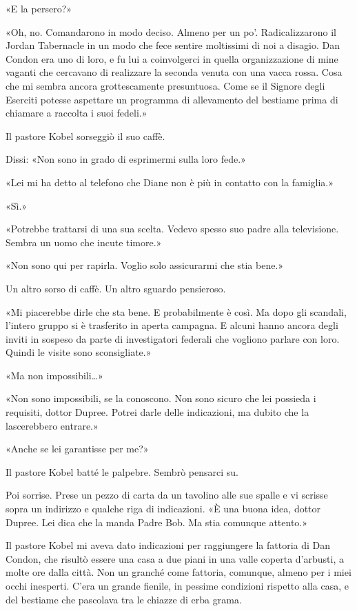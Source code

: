 «E la persero?»

«Oh, no. Comandarono in modo deciso. Almeno per un po'. Radicalizzarono
il Jordan Tabernacle in un modo che fece sentire moltissimi di noi a
disagio. Dan Condon era uno di loro, e fu lui a coinvolgerci in quella
organizzazione di mine vaganti che cercavano di realizzare la seconda
venuta con una vacca rossa. Cosa che mi sembra ancora grottescamente
presuntuosa. Come se il Signore degli Eserciti potesse aspettare un
programma di allevamento del bestiame prima di chiamare a raccolta i
suoi fedeli.»

Il pastore Kobel sorseggiò il suo caffè.

Dissi: «Non sono in grado di esprimermi sulla loro fede.»

«Lei mi ha detto al telefono che Diane non è più in contatto con la
famiglia.»

«Sì.»

«Potrebbe trattarsi di una sua scelta. Vedevo spesso suo padre alla
televisione. Sembra un uomo che incute timore.»

«Non sono qui per rapirla. Voglio solo assicurarmi che stia bene.»

Un altro sorso di caffè. Un altro sguardo pensieroso.

«Mi piacerebbe dirle che sta bene. E probabilmente è così. Ma dopo gli
scandali, l'intero gruppo si è trasferito in aperta campagna. E alcuni
hanno ancora degli inviti in sospeso da parte di investigatori federali
che vogliono parlare con loro. Quindi le visite sono sconsigliate.»

«Ma non impossibili\ldots»

«Non sono impossibili, se la conoscono. Non sono sicuro che lei possieda
i requisiti, dottor Dupree. Potrei darle delle indicazioni, ma dubito
che la lascerebbero entrare.»

«Anche se lei garantisse per me?»

Il pastore Kobel batté le palpebre. Sembrò pensarci su.

Poi sorrise. Prese un pezzo di carta da un tavolino alle sue spalle e vi
scrisse sopra un indirizzo e qualche riga di indicazioni. «È una buona
idea, dottor Dupree. Lei dica che la manda Padre Bob. Ma stia comunque
attento.»

\separatorefiori

Il pastore Kobel mi aveva dato indicazioni per raggiungere la fattoria
di Dan Condon, che risultò essere una casa a due piani in una valle
coperta d'arbusti, a molte ore dalla città. Non un granché come
fattoria, comunque, almeno per i miei occhi inesperti. C'era un grande
fienile, in pessime condizioni rispetto alla casa, e del bestiame che
pascolava tra le chiazze di erba grama.

